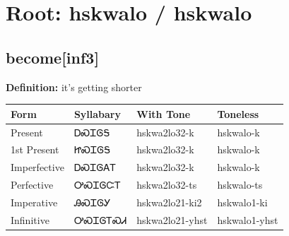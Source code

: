 \documentclass{article}%
\begin{document}
%
\normalsize%
\section*{Root: hskwalo / hskwalo}%
\subsection*{become[inf3]}%
\textbf{Definition: }%
it’s getting shorter%
\\[0.5em]%
\begin{tabular}{|l|l|l|l|}%
\hline%
\textbf{Form}&\textbf{Syllabary}&\textbf{With Tone}&\textbf{Toneless}\\%
\hline%
Present&ᎠᏍᏆᎶᎦ&hskwa2lo32{-}k&hskwalo{-}k\\%
1st Present&ᏥᏍᏆᎶᎦ&hskwa2lo32{-}k&hskwalo{-}k\\%
Imperfective&ᎠᏍᏆᎶᎪᎢ&hskwa2lo32{-}k&hskwalo{-}k\\%
Perfective&ᎤᏍᏆᎶᏨᎢ&hskwa2lo32{-}ts&hskwalo{-}ts\\%
Imperative&ᎯᏍᏆᎶᎩ&hskwa2lo21{-}ki2&hskwalo1{-}ki\\%
Infinitive&ᎤᏍᏆᎶᎢᏍᏗ&hskwa2lo21{-}yhst&hskwalo1{-}yhst\\%
\hline%
\end{tabular}%
\\[1em]%
\end{document}
